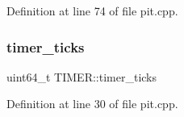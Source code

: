Definition at line 74 of file pit.\+cpp.

\mbox{\label{namespace_t_i_m_e_r_a403ab666b1023ff9771d1b1c9fed0015}} 
\subsubsection{\texorpdfstring{timer\+\_\+ticks}{timer\_ticks}}
{\footnotesize\ttfamily uint64\+\_\+t T\+I\+M\+E\+R\+::timer\+\_\+ticks}



Definition at line 30 of file pit.\+cpp.


